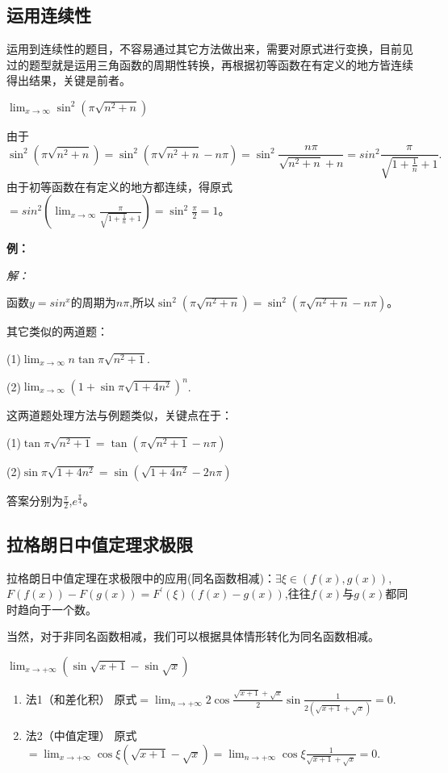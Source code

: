 \subsection{运用连续性}
运用到连续性的题目，不容易通过其它方法做出来，需要对原式进行变换，目前见过的题型就是运用三角函数的周期性转换，再根据初等函数在有定义的地方皆连续得出结果，关键是前者。
\begin{example}
	$\lim_{x \to \infty}\sin ^2(\pi \sqrt{n^2+n})$
	\begin{solution}
		由于$$\sin^2(\pi \sqrt{n^2+n})=\sin^2(\pi \sqrt{n^2+n}-n\pi)=\sin^2\frac{n\pi}{\sqrt{n^2+n}+n}=sin^2\frac{\pi}{\sqrt{1+\frac{1}{n}}+1}.$$由于初等函数在有定义的地方都连续，得原式$=sin^2(\lim_{x \to \infty}\frac{\pi}{\sqrt{1+\frac{1}{n}}+1})=\sin^2\frac{\pi}{2}=1$。
	\end{solution}
\end{example}
\textbf{例：}

\textit{解：}

\begin{remark}
	函数$y=sin^x$的周期为$n\pi$,所以$\sin^2(\pi \sqrt{n^2+n})=\sin^2(\pi \sqrt{n^2+n}-n\pi)$。
\end{remark}

其它类似的两道题：

(1)$\lim_{x \to \infty}n\tan \pi \sqrt{n^2+1}$.

(2)$\lim_{x \to \infty}(1+\sin \pi \sqrt{1+4n^2})^n$.

这两道题处理方法与例题类似，关键点在于：

(1)$\tan \pi \sqrt{n^2+1} =\tan (\pi \sqrt{n^2+1}-n\pi)$

(2)$\sin\pi\sqrt{1+4n^2}=\sin(\sqrt{1+4n^2}-2n\pi)$

答案分别为$\frac{\pi}{2}$,$e^{\frac{\pi}{4}}$。

\subsection{拉格朗日中值定理求极限}

拉格朗日中值定理在求极限中的应用(同名函数相减)：$\exists \xi \in (f(x),g(x))$,\\	$F(f(x))-F(g(x))=F^{'}(\xi)(f(x)-g(x))$,往往$f(x)$与$g(x)$都同时趋向于一个数。

当然，对于非同名函数相减，我们可以根据具体情形转化为同名函数相减。

\begin{example}
	$\lim_{x \to +\infty}(\sin \sqrt{x+1}-\sin \sqrt{x})$
	\begin{solution}
		\begin{enumerate}
			\item 法1（和差化积）
			      原式$=\lim_{n \to +\infty}2\cos \frac{\sqrt{x+1}+\sqrt{x}}{2}\sin \frac{1}{2(\sqrt{x+1}+\sqrt{x})}=0$.
			\item 法2（中值定理）
			      原式$=\lim_{x \to +\infty}\cos \xi(\sqrt{x+1}-\sqrt{x})=\lim_{n \to +\infty}\cos \xi \frac{1}{\sqrt{x+1}+\sqrt{x}}=0$.
		\end{enumerate}
	\end{solution}
\end{example}

